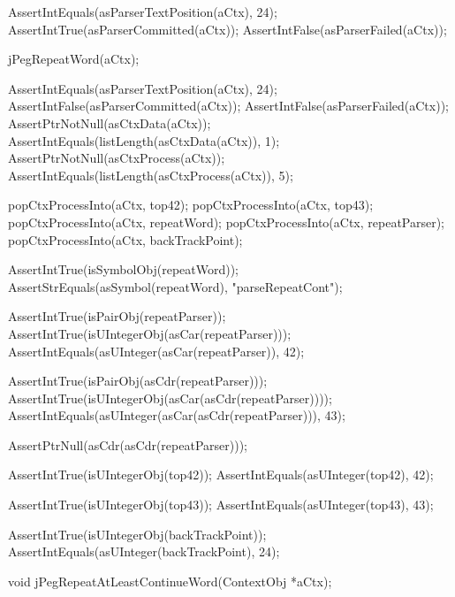   AssertIntEquals(asParserTextPosition(aCtx), 24);
  AssertIntTrue(asParserCommitted(aCtx));
  AssertIntFalse(asParserFailed(aCtx));
  
  jPegRepeatWord(aCtx);
  
  AssertIntEquals(asParserTextPosition(aCtx), 24);
  AssertIntFalse(asParserCommitted(aCtx));
  AssertIntFalse(asParserFailed(aCtx));
  AssertPtrNotNull(asCtxData(aCtx));
  AssertIntEquals(listLength(asCtxData(aCtx)), 1);
  AssertPtrNotNull(asCtxProcess(aCtx));
  AssertIntEquals(listLength(asCtxProcess(aCtx)), 5);
    
  popCtxProcessInto(aCtx, top42);
  popCtxProcessInto(aCtx, top43);
  popCtxProcessInto(aCtx, repeatWord);
  popCtxProcessInto(aCtx, repeatParser);
  popCtxProcessInto(aCtx, backTrackPoint);
  
  AssertIntTrue(isSymbolObj(repeatWord));
  AssertStrEquals(asSymbol(repeatWord), "parseRepeatCont");
  
  AssertIntTrue(isPairObj(repeatParser));
  AssertIntTrue(isUIntegerObj(asCar(repeatParser)));
  AssertIntEquals(asUInteger(asCar(repeatParser)), 42);
  
  AssertIntTrue(isPairObj(asCdr(repeatParser)));
  AssertIntTrue(isUIntegerObj(asCar(asCdr(repeatParser))));
  AssertIntEquals(asUInteger(asCar(asCdr(repeatParser))), 43);
  
  AssertPtrNull(asCdr(asCdr(repeatParser)));
  
  AssertIntTrue(isUIntegerObj(top42));
  AssertIntEquals(asUInteger(top42), 42);  

  AssertIntTrue(isUIntegerObj(top43));
  AssertIntEquals(asUInteger(top43), 43);
  
  AssertIntTrue(isUIntegerObj(backTrackPoint));
  AssertIntEquals(asUInteger(backTrackPoint), 24);
\stopCTest
\stopTestCase
\stopTestSuite

\startTestSuite[jPegRepeatAtLeastContinueWord]

\startCHeader
void jPegRepeatAtLeastContinueWord(ContextObj *aCtx);
\stopCHeader

